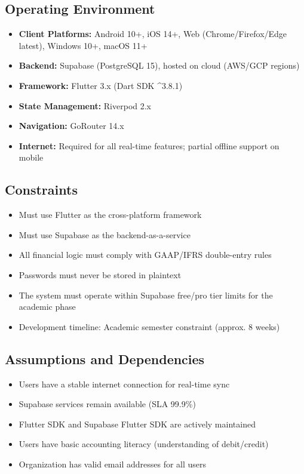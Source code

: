\documentclass[journal, a4paper, onecolumn, 12pt]{IEEEtran}
\begin{document}
\subsection{Operating Environment}
\begin{itemize}[leftmargin=*]
\item \textbf{Client Platforms:} Android 10+, iOS 14+, Web (Chrome/Firefox/Edge latest), Windows 10+, macOS 11+
\item \textbf{Backend:} Supabase (PostgreSQL 15), hosted on cloud (AWS/GCP regions)
\item \textbf{Framework:} Flutter 3.x (Dart SDK ^3.8.1)
\item \textbf{State Management:} Riverpod 2.x
\item \textbf{Navigation:} GoRouter 14.x
\item \textbf{Internet:} Required for all real-time features; partial offline support on mobile
\end{itemize}

\subsection{Constraints}
\begin{itemize}[leftmargin=*]
\item Must use Flutter as the cross-platform framework
\item Must use Supabase as the backend-as-a-service
\item All financial logic must comply with GAAP/IFRS double-entry rules
\item Passwords must never be stored in plaintext
\item The system must operate within Supabase free/pro tier limits for the academic phase
\item Development timeline: Academic semester constraint (approx. 8 weeks)
\end{itemize}

\subsection{Assumptions and Dependencies}
\begin{itemize}[leftmargin=*]
\item Users have a stable internet connection for real-time sync
\item Supabase services remain available (SLA 99.9\%)
\item Flutter SDK and Supabase Flutter SDK are actively maintained
\item Users have basic accounting literacy (understanding of debit/credit)
\item Organization has valid email addresses for all users
\end{itemize}
\end{document}
